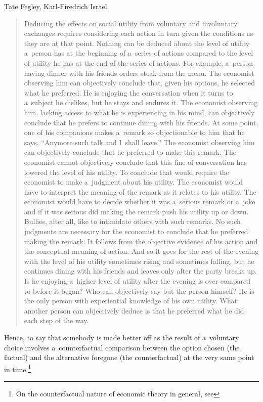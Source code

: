 \begin{artengenv2auth}{Tate Fegley, Karl-Firedrich Israel}
\begin{quote}
Deducing the effects on social utility from voluntary and involuntary exchanges requires considering each action in turn given the conditions as they are at that point. Nothing can be deduced about the level of utility a~person has at the beginning of a~series of actions compared to the level of utility he has at the end of the series of actions. For example, a~person having dinner with his friends orders steak from the menu. The economist observing him can objectively conclude that, given his options, he selected what he preferred. He is enjoying the conversation when it turns to a~subject he dislikes, but he stays and endures it. The economist observing him, lacking access to what he is experiencing in his mind, can objectively conclude that he prefers to continue dining with his friends. At some point, one of his companions makes a~remark so objectionable to him that he says, ``Anymore such talk and I~shall leave.'' The economist observing him can objectively conclude that he preferred to make this remark. The economist cannot objectively conclude that this line of conversation has lowered the level of his utility. To conclude that would require the economist to make a~judgment about his utility. The economist would have to interpret the meaning of the remark as it relates to his utility. The economist would have to decide whether it was a~serious remark or a~joke and if it was serious did making the remark push his utility up or down. Bullies, after all, like to intimidate others with such remarks. No such judgments are necessary for the economist to conclude that he preferred making the remark. It follows from the objective evidence of his action and the conceptual meaning of action. And so it goes for the rest of the evening with the level of his utility sometimes rising and sometimes falling, but he continues dining with his friends and leaves only after the party breaks up. Is he enjoying a~higher level of utility after the evening is over compared to before it began? Who can objectively say but the person himself? He is the only person with experiential knowledge of his own utility. What another person can objectively deduce is that he preferred what he did each step of the way. 
\parencite[][p.63]{herbener_defense_2008}%
\end{quote}
Hence, to say that somebody is made better off as the result of a~voluntary choice involves a~counterfactual comparison between the option chosen (the factual) and the alternative foregone (the counterfactual) at the very same point in time.\footnote{On the counterfactual nature of economic theory in general, see 
}
\end{artengenv2auth}
